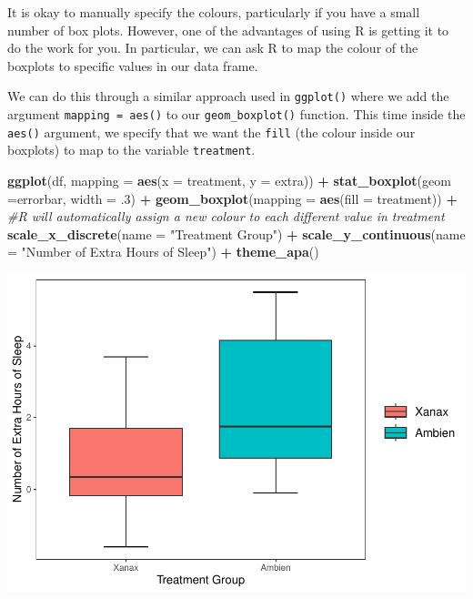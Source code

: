 \documentclass[
]{book}
\newenvironment{Shaded}{\begin{snugshade}}{\end{snugshade}}
\newcommand{\AttributeTok}[1]{\textcolor[rgb]{0.13,0.29,0.53}{#1}}
\newcommand{\CommentTok}[1]{\textcolor[rgb]{0.56,0.35,0.01}{\textit{#1}}}
\newcommand{\DecValTok}[1]{\textcolor[rgb]{0.00,0.00,0.81}{#1}}
\newcommand{\FunctionTok}[1]{\textcolor[rgb]{0.13,0.29,0.53}{\textbf{#1}}}
\newcommand{\NormalTok}[1]{#1}
\newcommand{\SpecialCharTok}[1]{\textcolor[rgb]{0.81,0.36,0.00}{\textbf{#1}}}
\newcommand{\StringTok}[1]{\textcolor[rgb]{0.31,0.60,0.02}{#1}}
\begin{document}
It is okay to manually specify the colours, particularly if you have a small number of box plots. However, one of the advantages of using R is getting it to do the work for you. In particular, we can ask R to map the colour of the boxplots to specific values in our data frame.

We can do this through a similar approach used in \texttt{ggplot()} where we add the argument \texttt{mapping\ =\ aes()} to our \texttt{geom\_boxplot()} function. This time inside the \texttt{aes()} argument, we specify that we want the \texttt{fill} (the colour inside our boxplots) to map to the variable \texttt{treatment}.

\begin{Shaded}
\begin{Highlighting}[]
\FunctionTok{ggplot}\NormalTok{(df, }\AttributeTok{mapping =} \FunctionTok{aes}\NormalTok{(}\AttributeTok{x =}\NormalTok{ treatment, }\AttributeTok{y =}\NormalTok{ extra)) }\SpecialCharTok{+} 
  \FunctionTok{stat\_boxplot}\NormalTok{(}\AttributeTok{geom =}\StringTok{\textquotesingle{}errorbar\textquotesingle{}}\NormalTok{, }\AttributeTok{width =}\NormalTok{ .}\DecValTok{3}\NormalTok{) }\SpecialCharTok{+}
  \FunctionTok{geom\_boxplot}\NormalTok{(}\AttributeTok{mapping =} \FunctionTok{aes}\NormalTok{(}\AttributeTok{fill =}\NormalTok{ treatment)) }\SpecialCharTok{+} \CommentTok{\#R will automatically assign a new colour to each different value in treatment}
  \FunctionTok{scale\_x\_discrete}\NormalTok{(}\AttributeTok{name =} \StringTok{"Treatment Group"}\NormalTok{) }\SpecialCharTok{+} 
  \FunctionTok{scale\_y\_continuous}\NormalTok{(}\AttributeTok{name =} \StringTok{"Number of Extra Hours of Sleep"}\NormalTok{) }\SpecialCharTok{+}
  \FunctionTok{theme\_apa}\NormalTok{()}
\end{Highlighting}
\end{Shaded}

\includegraphics{rintro_demo_files/figure-latex/unnamed-chunk-295-1.pdf}
\end{document}

